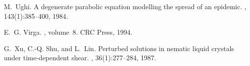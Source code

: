 \documentclass[11pt,leqno]{amsart}
\begin{document}
\begin{thebibliography}{10}
M.~Ughi.
\newblock A degenerate parabolic equation modelling the spread of an epidemic.
, 143(1):385--400, 1984.

E.~G. Virga.
, volume~8.
\newblock CRC Press, 1994.

G.~Xu, C.-Q. Shu, and L.~Lin.
\newblock Perturbed solutions in nematic liquid crystals under time-dependent
  shear.
, 36(1):277--284, 1987.

\end{thebibliography}
\end{document}
